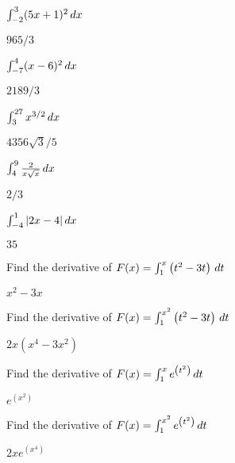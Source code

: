 \begin{exercises}
\begin{exercise} $\int_{-2}^3 (5x+1)^2\, d x$
\begin{answer} $965/3$
\end{answer}\end{exercise}

\begin{exercise} $\int_{-7}^4(x-6)^2 \, d x$
\begin{answer} $2189/3$
\end{answer}\end{exercise}

\begin{exercise} $\int_3^{27}x^{3/2}\, d x$
\begin{answer} $4356 \sqrt{3}/5$
\end{answer}\end{exercise}

\begin{exercise} $\int_4^9\frac{2}{x\sqrt x}\, d x$
\begin{answer} $2/3$
\end{answer}\end{exercise}

\begin{exercise} $\int_{-4}^1|2x-4|\, d x$
\begin{answer} $35$
\end{answer}\end{exercise}

\endtwocol

\begin{exercise} Find the derivative of $F(x)=\int_1^x \left(t^2-3t\right)\, d t$
\begin{answer} $x^2-3x$
\end{answer}\end{exercise}

\begin{exercise} Find the derivative of $F(x)=\int_1^{x^2} \left(t^2-3t\right)\, d t$
\begin{answer} $2x(x^4-3x^2)$
\end{answer}\end{exercise}

\begin{exercise} Find the derivative of $F(x)=\int_1^x e^{\left(t^2\right)}\, d t$
\begin{answer} $e^{\left(x^2\right)}$
\end{answer}\end{exercise}

\begin{exercise} Find the derivative of $F(x)=\int_1^{x^2} e^{\left(t^2\right)}\, d t$
\begin{answer} $2xe^{\left(x^4\right)}$
\end{answer}\end{exercise}



\end{exercises}
